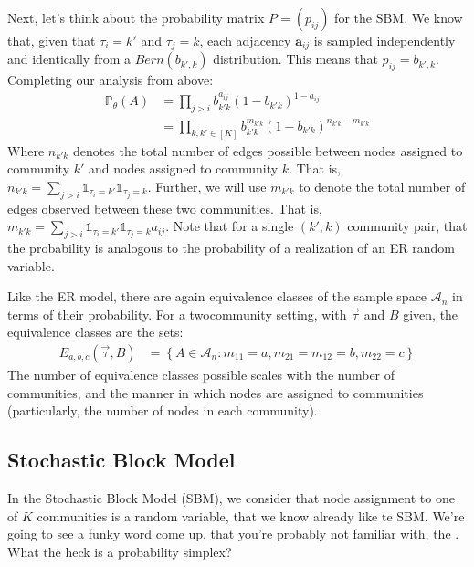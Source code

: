 \documentclass[letterpaper,10pt,english]{jupyterBook}
\begin{document}
\sphinxAtStartPar
Next, let’s think about the probability matrix \(P = (p_{ij})\) for the  SBM. We know that, given that \(\tau_i = k'\) and \(\tau_j = k\),  each adjacency \(\mathbf a_{ij}\) is sampled independently and identically from a \(Bern(b_{k',k})\) distribution. This means that \(p_{ij} = b_{k',k}\). Completing our analysis from above:
\begin{align*}
    \mathbb P_\theta(A) &= \prod_{j > i} b_{k'k}^{a_{ij}}(1 - b_{k'k})^{1 - a_{ij}} \\
    &= \prod_{k,k' \in [K]}b_{k'k}^{m_{k'k}}(1 - b_{k'k})^{n_{k'k} - m_{k'k}}
\end{align*}
\sphinxAtStartPar
Where \(n_{k' k}\) denotes the total number of edges possible between nodes assigned to community \(k'\) and nodes assigned to community \(k\). That is, \(n_{k' k} = \sum_{j > i} \mathbb 1_{\tau_i = k'}\mathbb 1_{\tau_j = k}\). Further, we will use \(m_{k' k}\) to denote the total number of edges observed between these two communities. That is, \(m_{k' k} = \sum_{j > i}\mathbb 1_{\tau_i = k'}\mathbb 1_{\tau_j = k}a_{ij}\). Note that for a single \((k',k)\) community pair, that the probability is analogous to the probability of a realization of an ER random variable.



\sphinxAtStartPar
Like the ER model, there are again equivalence classes of the sample space \(\mathcal A_n\) in terms of their probability. For a two\sphinxhyphen{}community setting, with \(\vec \tau\) and \(B\) given, the equivalence classes are the sets:
\begin{align*}
    E_{a,b,c}(\vec \tau, B) &= \left\{A \in \mathcal A_n : m_{11} = a, m_{21}=m_{12} = b, m_{22} = c\right\}
\end{align*}
\sphinxAtStartPar
The number of equivalence classes possible scales with the number of communities, and the manner in which nodes are assigned to communities (particularly, the number of nodes in each community).


\subsection{ Stochastic Block Model}
\label{\detokenize{representations/ch5/single-network-models_theory:a-posteriori-stochastic-block-model}}
\sphinxAtStartPar
In the  Stochastic Block Model (SBM), we consider that node assignment to one of \(K\) communities is a random variable, that we  know already like te  SBM. We’re going to see a funky word come up, that you’re probably not familiar with, the . What the heck is a probability simplex?
\end{document}
